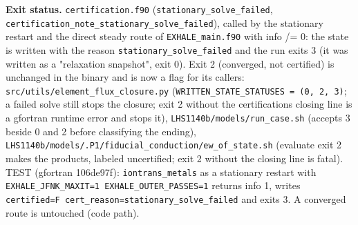 \documentclass[english,a4paper]{my_memo}
\begin{document}
\textbf{Exit status.} \texttt{certification.f90} (\texttt{stationary\_solve\_failed},
\texttt{certification\_note\_stationary\_solve\_failed}), called by the stationary restart
and the direct steady route of \texttt{EXHALE\_main.f90} with info /= 0: the state is
written with the reason \texttt{stationary\_solve\_failed} and the run exits 3 (it was
written as a "relaxation snapshot", exit 0). Exit 2 (converged, not certified)
is unchanged in the binary and is now a flag for its callers:
\texttt{src/utils/element\_flux\_closure.py} (\texttt{WRITTEN\_STATE\_STATUSES\ =\ (0,\ 2,\ 3)}; a
failed solve still stops the closure; exit 2 without the certification\textquotesingle s closing
line is a gfortran runtime error and stops it), \texttt{LHS1140b/models/run\_case.sh}
(accepts 3 beside 0 and 2 before classifying the ending),
\texttt{LHS1140b/models/.P1/fiducial\_conduction/ew\_of\_state.sh} (evaluate exit 2 makes
the products, labeled uncertified; exit 2 without the closing line is fatal).
TEST (gfortran 106de97f): \texttt{iontrans\_metals} as a stationary restart with
\texttt{EXHALE\_JFNK\_MAXIT=1\ EXHALE\_OUTER\_PASSES=1} returns info 1, writes
\texttt{certified=F\ cert\_reason=stationary\_solve\_failed} and exits 3. A converged route
is untouched (code path).
\end{document}

